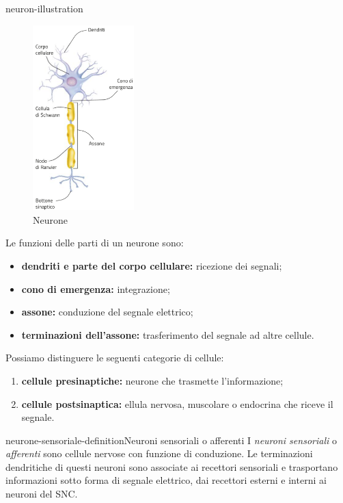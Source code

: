 \documentclass[preview]{standalone}
\begin{document}
\begin{snippet}{neuron-illustration}
    \setlength{\intextsep}{0pt}%
    \begin{figure}
        \includegraphics[width=0.35\textwidth]{./resources/neuron.png}
        \caption{Neurone}
        \vspace{-1cm}
    \end{figure}

    Le funzioni delle parti di un neurone sono:
    \begin{itemize}
        \item \textbf{dendriti e parte del corpo cellulare:} ricezione dei segnali;
        \item \textbf{cono di emergenza:} integrazione;
        \item \textbf{assone:} conduzione del segnale elettrico;
        \item \textbf{terminazioni dell'assone:} trasferimento del segnale ad altre cellule.
    \end{itemize}

    Possiamo distinguere le seguenti categorie di cellule:
    \begin{enumerate}
        \item \textbf{cellule presinaptiche:} neurone che trasmette l'informazione;
        \item\textbf{cellule postsinaptica:} ellula nervosa, muscolare o endocrina che riceve il segnale.
    \end{enumerate}

    \wrapfill
\end{snippet}

\begin{snippetdefinition}{neurone-sensoriale-definition}{Neuroni sensoriali o afferenti}
    I \textit{neuroni sensoriali} o \textit{afferenti} sono
    cellule nervose con funzione di conduzione. Le terminazioni dendritiche di questi neuroni
    sono associate ai recettori sensoriali e trasportano informazioni sotto forma di segnale
    elettrico, dai recettori esterni e interni ai neuroni del SNC.
\end{snippetdefinition}
\end{document}
